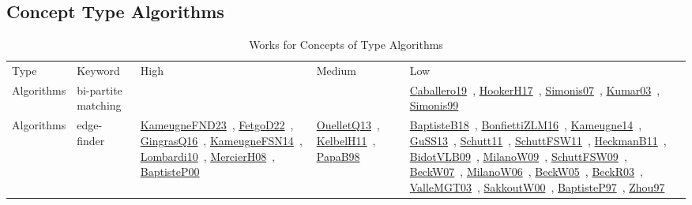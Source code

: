 \clearpage
\subsection{Concept Type Algorithms}
\label{sec:Algorithms}
{\scriptsize
\begin{longtable}{lp{3cm}>{\raggedright\arraybackslash}p{6cm}>{\raggedright\arraybackslash}p{6cm}>{\raggedright\arraybackslash}p{8cm}}
\rowcolor{white}\caption{Works for Concepts of Type Algorithms}\\ \toprule
\rowcolor{white}Type & Keyword & High & Medium & Low\\ \midrule\endhead
\bottomrule
\endfoot
Algorithms & bi-partite matching &  &  & \href{works/Caballero19.pdf}{Caballero19}~\cite{Caballero19}, \href{works/HookerH17.pdf}{HookerH17}~\cite{HookerH17}, \href{works/Simonis07.pdf}{Simonis07}~\cite{Simonis07}, \href{works/Kumar03.pdf}{Kumar03}~\cite{Kumar03}, \href{works/Simonis99.pdf}{Simonis99}~\cite{Simonis99}\\
Algorithms & edge-finder & \href{works/KameugneFND23.pdf}{KameugneFND23}~\cite{KameugneFND23}, \href{works/FetgoD22.pdf}{FetgoD22}~\cite{FetgoD22}, \href{works/GingrasQ16.pdf}{GingrasQ16}~\cite{GingrasQ16}, \href{works/KameugneFSN14.pdf}{KameugneFSN14}~\cite{KameugneFSN14}, \href{works/Lombardi10.pdf}{Lombardi10}~\cite{Lombardi10}, \href{works/MercierH08.pdf}{MercierH08}~\cite{MercierH08}, \href{works/BaptisteP00.pdf}{BaptisteP00}~\cite{BaptisteP00} & \href{works/OuelletQ13.pdf}{OuelletQ13}~\cite{OuelletQ13}, \href{works/KelbelH11.pdf}{KelbelH11}~\cite{KelbelH11}, \href{works/PapaB98.pdf}{PapaB98}~\cite{PapaB98} & \href{works/BaptisteB18.pdf}{BaptisteB18}~\cite{BaptisteB18}, \href{works/BonfiettiZLM16.pdf}{BonfiettiZLM16}~\cite{BonfiettiZLM16}, \href{works/Kameugne14.pdf}{Kameugne14}~\cite{Kameugne14}, \href{works/GuSS13.pdf}{GuSS13}~\cite{GuSS13}, \href{works/Schutt11.pdf}{Schutt11}~\cite{Schutt11}, \href{works/SchuttFSW11.pdf}{SchuttFSW11}~\cite{SchuttFSW11}, \href{works/HeckmanB11.pdf}{HeckmanB11}~\cite{HeckmanB11}, \href{works/BidotVLB09.pdf}{BidotVLB09}~\cite{BidotVLB09}, \href{works/MilanoW09.pdf}{MilanoW09}~\cite{MilanoW09}, \href{works/SchuttFSW09.pdf}{SchuttFSW09}~\cite{SchuttFSW09}, \href{works/BeckW07.pdf}{BeckW07}~\cite{BeckW07}, \href{works/MilanoW06.pdf}{MilanoW06}~\cite{MilanoW06}, \href{works/BeckW05.pdf}{BeckW05}~\cite{BeckW05}, \href{works/BeckR03.pdf}{BeckR03}~\cite{BeckR03}, \href{works/ValleMGT03.pdf}{ValleMGT03}~\cite{ValleMGT03}, \href{works/SakkoutW00.pdf}{SakkoutW00}~\cite{SakkoutW00}, \href{works/BaptisteP97.pdf}{BaptisteP97}~\cite{BaptisteP97}, \href{works/Zhou97.pdf}{Zhou97}~\cite{Zhou97}\\

\end{longtable}}
